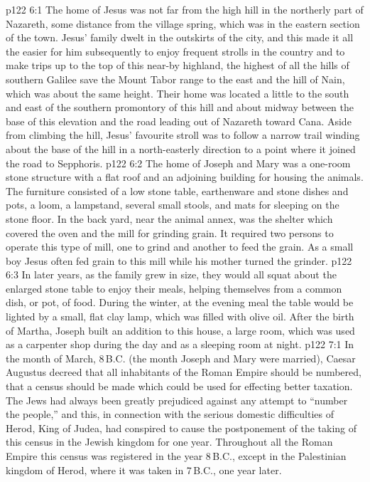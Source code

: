 \vs p122 6:1 The home of Jesus was not far from the high hill in the northerly part of Nazareth, some distance from the village spring, which was in the eastern section of the town. Jesus’ family dwelt in the outskirts of the city, and this made it all the easier for him subsequently to enjoy frequent strolls in the country and to make trips up to the top of this near\hyp{}by highland, the highest of all the hills of southern Galilee save the Mount Tabor range to the east and the hill of Nain, which was about the same height. Their home was located a little to the south and east of the southern promontory of this hill and about midway between the base of this elevation and the road leading out of Nazareth toward Cana. Aside from climbing the hill, Jesus’ favourite stroll was to follow a narrow trail winding about the base of the hill in a north\hyp{}easterly direction to a point where it joined the road to Sepphoris.
\vs p122 6:2 The home of Joseph and Mary was a one\hyp{}room stone structure with a flat roof and an adjoining building for housing the animals. The furniture consisted of a low stone table, earthenware and stone dishes and pots, a loom, a lampstand, several small stools, and mats for sleeping on the stone floor. In the back yard, near the animal annex, was the shelter which covered the oven and the mill for grinding grain. It required two persons to operate this type of mill, one to grind and another to feed the grain. As a small boy Jesus often fed grain to this mill while his mother turned the grinder.
\vs p122 6:3 In later years, as the family grew in size, they would all squat about the enlarged stone table to enjoy their meals, helping themselves from a common dish, or pot, of food. During the winter, at the evening meal the table would be lighted by a small, flat clay lamp, which was filled with olive oil. After the birth of Martha, Joseph built an addition to this house, a large room, which was used as a carpenter shop during the day and as a sleeping room at night.
\vs p122 7:1 In the month of March, 8\,B.C. (the month Joseph and Mary were married), Caesar Augustus decreed that all inhabitants of the Roman Empire should be numbered, that a census should be made which could be used for effecting better taxation. The Jews had always been greatly prejudiced against any attempt to “number the people,” and this, in connection with the serious domestic difficulties of Herod, King of Judea, had conspired to cause the postponement of the taking of this census in the Jewish kingdom for one year. Throughout all the Roman Empire this census was registered in the year 8\,B.C., except in the Palestinian kingdom of Herod, where it was taken in 7\,B.C., one year later.
